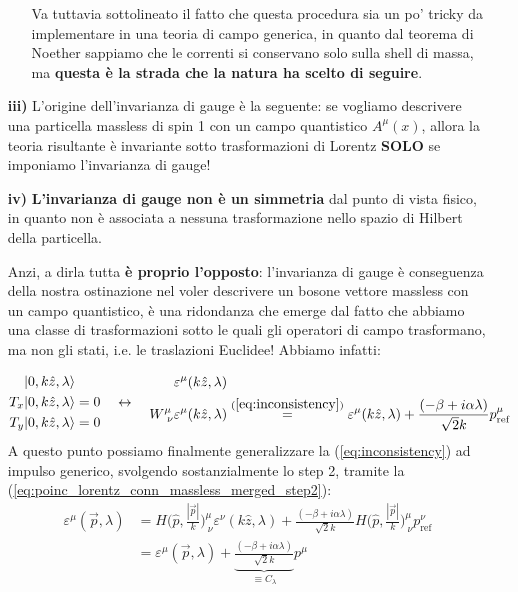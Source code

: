 \documentclass[../main.tex]{subfiles}
\begin{document}
\begin{enumerate}
\begin{itemize}
        Va tuttavia sottolineato il fatto che questa procedura sia un po' tricky da implementare in una teoria di campo generica, in quanto dal teorema di Noether sappiamo che le correnti si conservano solo sulla shell di massa, ma \textbf{questa è la strada che la natura ha scelto di seguire}.
    \end{itemize}

    \item[\textbf{iii)}] L'origine dell'invarianza di gauge è la seguente: se vogliamo descrivere una particella massless di spin 1 con un campo quantistico $A^\mu(x)$, allora la teoria risultante è invariante sotto trasformazioni di Lorentz \textbf{SOLO} se imponiamo l'invarianza di gauge!
    
    \item[\textbf{iv)}] \textbf{L'invarianza di gauge non è un simmetria} dal punto di vista fisico, in quanto non è associata a nessuna trasformazione nello spazio di Hilbert della particella. 

    Anzi, a dirla tutta \textbf{è proprio l'opposto}: l'invarianza di gauge è conseguenza della nostra ostinazione nel voler descrivere un bosone vettore massless con un campo quantistico, è una ridondanza che emerge dal fatto che abbiamo una classe di trasformazioni sotto le quali gli operatori di campo trasformano, ma non gli stati, i.e. le traslazioni Euclidee! Abbiamo infatti:

    \[
    \begin{aligned}
        &|0, k\hat{z}, \lambda\rangle \\ 
        T_x&|0, k\hat{z}, \lambda\rangle = 0\\
        T_y&|0, k\hat{z}, \lambda\rangle = 0
    \end{aligned}
    \quad\leftrightarrow\quad
    \begin{aligned}
        &\varepsilon^\mu(k\hat{z}, \lambda)\\ 
        W^\mu_{~\nu}&\varepsilon^\mu(k\hat{z}, \lambda) \overset{(\ref{eq:inconsistency})}{=} \varepsilon^\mu(k\hat{z}, \lambda) + \frac{(-\beta+i\alpha\lambda)}{\sqrt{2}k}p^\mu_\text{ref}
    \end{aligned}
    \]
    A questo punto possiamo finalmente generalizzare la (\ref{eq:inconsistency}) ad impulso generico, svolgendo sostanzialmente lo step 2, tramite la (\ref{eq:poinc_lorentz_conn_massless_merged_step2}):
    \begin{align*}
         \varepsilon^\mu(\Vec{p},\lambda) &= H\Big(\hat{p},\frac{|\Vec p|}{k}\Big)^\mu_{~\nu}\varepsilon^\nu(k\hat{z}, \lambda) + \frac{(-\beta+i\alpha\lambda)}{\sqrt{2}k}H\Big(\hat{p},\frac{|\Vec p|}{k}\Big)^\mu_{~\nu}p^\nu_\text{ref}\\
         &= \varepsilon^\mu(\Vec{p},\lambda) +\underbrace{\frac{(-\beta+i\alpha\lambda)}{\sqrt{2}k}}_{\equiv C_\lambda}p^\mu
    \end{align*}
    

\end{enumerate}
\end{document}
